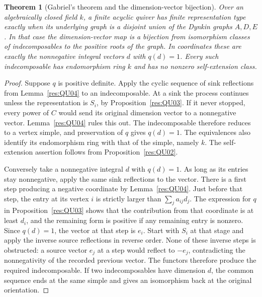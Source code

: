 \documentclass[11pt,oneside,openany]{book}
\newtheorem{theorem}{Theorem}[chapter]
\theoremstyle{definition}
\theoremstyle{remark}
\begin{document}
\begin{theorem}[Gabriel's theorem and the dimension-vector bijection]
\label{res:QU07}
Over an algebraically closed field \(k\), a finite acyclic quiver
has finite representation type exactly when its underlying graph
is a disjoint union of the Dynkin graphs \(A,D,E\).
In that case the dimension-vector map is a bijection from
isomorphism classes of indecomposables to the positive roots of
the graph. In coordinates these are exactly the nonnegative
integral vectors \(d\) with \(q(d)=1\).
Every such indecomposable has endomorphism ring \(k\)
and has no nonzero self-extension class.
\end{theorem}
\begin{proof}
Suppose \(q\) is positive definite. Apply the cyclic sequence of
sink reflections from Lemma~\ref{res:QU04} to an indecomposable.
At a sink the process continues unless the representation is
\(S_i\), by Proposition~\ref{res:QU03}. If it never stopped,
every power of \(C\) would send its original dimension vector
to a nonnegative vector. Lemma~\ref{res:QU04} rules this out.
The indecomposable therefore reduces to a vertex simple, and
preservation of \(q\) gives \(q(d)=1\). The equivalences also
identify its endomorphism ring with that of the simple, namely
\(k\). The self-extension assertion follows from
Proposition~\ref{res:QU02}.

Conversely take a nonnegative integral \(d\) with \(q(d)=1\).
As long as its entries stay nonnegative, apply the same sink
reflections to the vector. There is a first step producing a
negative coordinate by Lemma~\ref{res:QU04}. Just before that
step, the entry at its vertex \(i\) is strictly larger than
\(\sum_j a_{ij}d_j\). The expression for \(q\) in
Proposition~\ref{res:QU03} shows that the contribution from
that coordinate is at least \(d_i\), and the remaining form is
positive if any remaining entry is nonzero. Since \(q(d)=1\),
the vector at that step is \(e_i\). Start with \(S_i\) at
that stage and apply the inverse source reflections in reverse
order. None of these inverse steps is obstructed: a source vector
\(e_j\) at a step would reflect to \(-e_j\), contradicting the
nonnegativity of the recorded previous vector. The functors
therefore produce the required indecomposable. If two
indecomposables have dimension \(d\), the common sequence ends
at the same simple and gives an isomorphism back at the
original orientation.


\end{proof}
\end{document}
